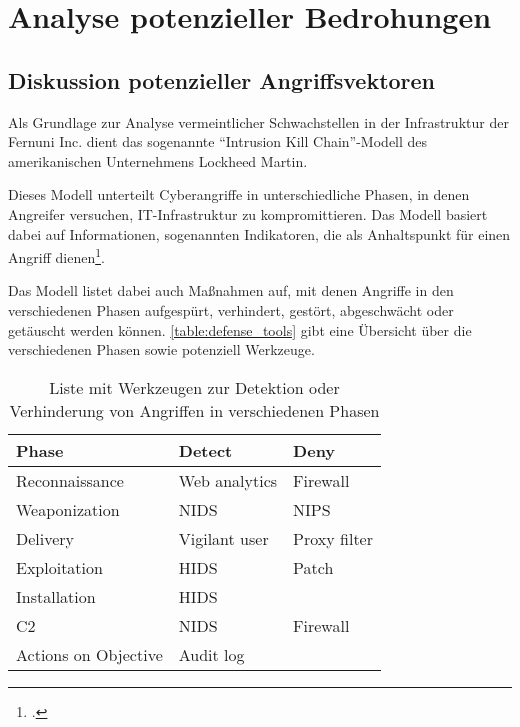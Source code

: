 \section{Analyse potenzieller Bedrohungen}

\subsection{Diskussion potenzieller Angriffsvektoren}

Als Grundlage zur Analyse vermeintlicher Schwachstellen in der Infrastruktur der Fernuni Inc. dient das sogenannte \enquote{Intrusion Kill Chain}-Modell des amerikanischen Unternehmens Lockheed Martin.

Dieses Modell unterteilt Cyberangriffe in unterschiedliche Phasen, in denen Angreifer versuchen, IT-Infrastruktur zu kompromittieren. Das Modell basiert dabei auf Informationen, sogenannten Indikatoren, die als Anhaltspunkt für einen Angriff dienen\footcite[Vgl.][]{hutchinsIntelligenceDrivenComputerNetwork}.

Das Modell listet dabei auch Maßnahmen auf, mit denen Angriffe in den verschiedenen Phasen aufgespürt, verhindert, gestört, abgeschwächt oder getäuscht werden können. \autoref{table:defense_tools} gibt eine Übersicht über die verschiedenen Phasen sowie potenziell Werkzeuge.

\begin{table}[ht]
    \begin{center}
        \begin{tabular}{|l|l|l|}
            \hline
            Phase                & Detect        & Deny         \\ \hline
            Reconnaissance       & Web analytics & Firewall     \\ \hline
            Weaponization        & NIDS          & NIPS         \\ \hline
            Delivery             & Vigilant user & Proxy filter \\ \hline
            Exploitation         & HIDS          & Patch        \\ \hline
            Installation         & HIDS          &              \\ \hline
            C2                   & NIDS          & Firewall     \\ \hline
    Actions on Objective & Audit log     &              \\ \hline
        \end{tabular}
    \caption{Liste mit Werkzeugen zur Detektion oder Verhinderung von Angriffen in verschiedenen Phasen}
    \label{table:defense_tools}
    \end{center}
\end{table}

